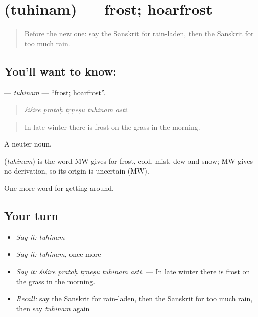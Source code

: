 \section[\texorpdfstring{\sk{तुहिनम्} (tuhinam)}{तुहिनम् (tuhinam)}]{ (tuhinam) — frost; hoarfrost}

\label{lesson:SA-C441-tuhinam}



\begin{quote}
Before the new one: say the Sanskrit for rain-laden, then the Sanskrit for too much rain.
\end{quote}

\subsection*{You'll want to know: }
\textbf{} — \emph{tuhinam} — \textquotedblleft{}frost; hoarfrost\textquotedblright{}.

\begin{quote}
    
\end{quote}

\begin{quote}
\emph{śiśire prātaḥ tṛṇeṣu tuhinam asti.}
\end{quote}

\begin{quote}
In late winter there is frost on the grass in the morning.
\end{quote}

A neuter noun.

\begin{cousinweb}
\textbf{} (\emph{tuhinam}) is the word MW gives for frost, cold, mist, dew and snow; MW gives no derivation, so its origin is uncertain (MW).
\end{cousinweb}

\begin{grammarlens}[title={What you've built}]
One more word for getting around.
\end{grammarlens}

\subsection*{Your turn}
\begin{itemize}
\raggedright
  \item \emph{Say it:} \emph{tuhinam}
  \item \emph{Say it:} \emph{tuhinam}, once more
  \item \emph{Say it:} \emph{śiśire prātaḥ tṛṇeṣu tuhinam asti.} — In late winter there is frost on the grass in the morning.
  \item \emph{Recall:} say the Sanskrit for rain-laden, then the Sanskrit for too much rain, then say \emph{tuhinam} again
\end{itemize}

